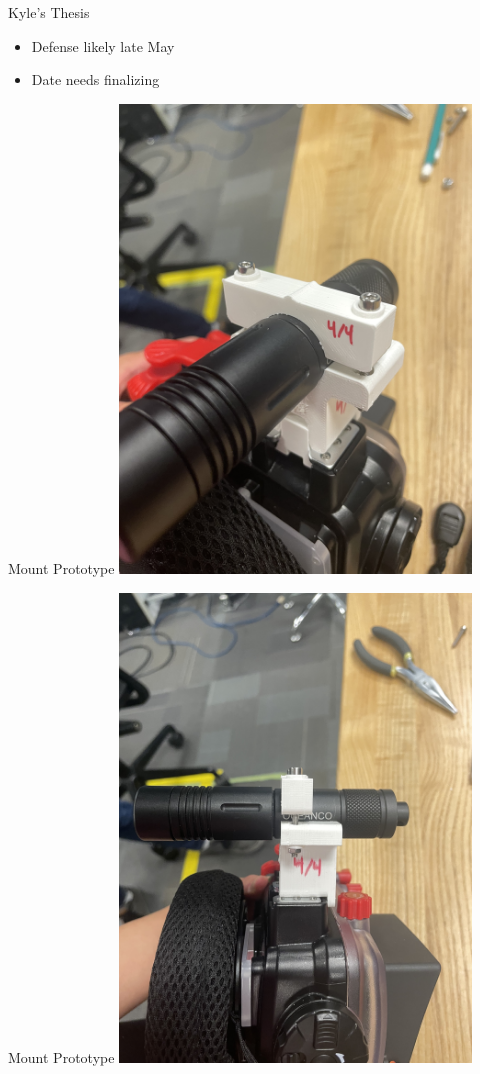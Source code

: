 \begin{frame}{Kyle's Thesis}
    \begin{itemize}
        \item Defense likely late May
        \item Date needs finalizing
    \end{itemize}
\end{frame}

\begin{frame}{Mount Prototype}
    \centering
    \includegraphics[height=0.7\textheight,width=0.7\textwidth,keepaspectratio]{images/IMG_5220.jpeg}
\end{frame}

\begin{frame}{Mount Prototype}
    \centering
    \includegraphics[height=0.7\textheight,width=0.7\textwidth,keepaspectratio]{images/IMG_5221.jpeg}
\end{frame}
